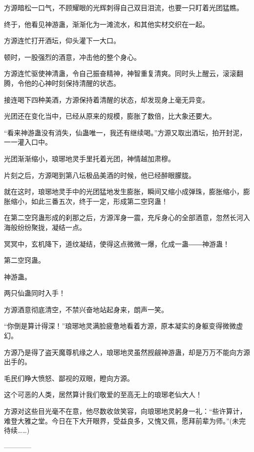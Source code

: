 \begin{this_body}
方源暗松一口气，不顾耀眼的光辉刺得自己双目泪流，也要一只盯着光团猛瞧。

终于，他看见神游蛊，渐渐化为一滩流水，和其他实材交织在一起。

方源连忙打开酒坛，仰头灌下一大口。

顿时，一股强烈的酒意，冲击他的整个身心。

方源连忙驱使神清蛊，令自己振奋精神，神智重复清爽。同时头上醒云，滚滚翻腾，令他的心神时刻保持清醒的状态。

接连喝下四种美酒，方源保持着清醒的状态，却发现身上毫无异变。

光团还在变化当中，已经从原来的规模，膨胀了数倍，比大象还要大。

“看来神游蛊没有消失，仙蛊唯一，我还有继续喝。”方源又取出酒坛，拍开封泥，一一灌入口中。

光团渐渐缩小，琅琊地灵手里托着光团，神情越加肃穆。

片刻之后，方源喝到第八坛极品美酒的时候，他已经醉眼朦胧。

就在这时，琅琊地灵手中的光团猛地发生膨胀，瞬间又缩小成弹珠，膨胀缩小，膨胀缩小，如此三番五次，终于一定，形成第二空窍蛊！

在第二空窍蛊形成的刹那之后，方源浑身一震，充斥身心的全部酒意，忽然长河入海般纷纷聚拢，凝结一点。

冥冥中，玄机降下，道纹凝结，使得这点微微一爆，化成一蛊――神游蛊！

第二空窍蛊。

神游蛊。

两只仙蛊同时入手！

方源酒意彻底清空，不禁兴奋地站起身来，朗声一笑。

“你倒是算计得深！”琅琊地灵满脸疲惫地看着方源，原本凝实的身躯变得微微虚幻。

方源乃是得了盗天魔尊机缘之人，琅琊地灵虽然觊觎神游蛊，却是万万不能向方源出手的。

毛民们睁大愤怒、鄙视的双眼，瞪向方源。

这个可恶的人类，居然算计我们敬爱的至高无上的琅琊老仙大人！

方源对这些目光毫不在意，他尽数收敛笑容，向琅琊地灵躬身一礼：“些许算计，难登大雅之堂。今日在下大开眼界，受益良多，又愧又佩，愿拜前辈为师。”(未完待续……)

------------

\end{this_body}

